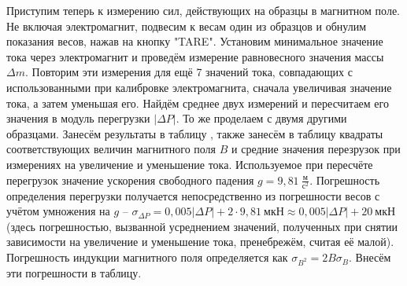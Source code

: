 \documentclass[a4paper,12pt]{article}
\begin{document}
Приступим теперь к измерению сил, действующих на образцы в магнитном поле. Не включая электромагнит, подвесим к весам один из образцов и обнулим показания весов, нажав на кнопку "TARE". Установим минимальное значение тока через электромагнит и проведём измерение равновесного значения массы $\Delta m$. Повторим эти измерения для ещё 7 значений тока, совпадающих с использованными при калибровке электромагнита, сначала увеличивая значение тока, а затем уменьшая его. Найдём среднее двух измерений и пересчитаем его значения в модуль перегрузки $\left|\Delta P\right|$. То же проделаем с двумя другими образцами. Занесём результаты в таблицу , также занесём в таблицу квадраты соответствующих величин магнитного поля $B$ и средние значения перезрузок при измерениях на увеличение и уменьшение тока. Используемое при пересчёте перегрузок значение ускорения свободного падения $g=9,81~\frac{\text{м}}{\text{с}^2}$. Погрешность определения перегрузки получается непосредственно из погрешности весов с учётом умножения на $g$ -- $\sigma_{\Delta P}=0,005\left|\Delta P\right|+2\cdot9,81~\text{мкН}\approx0,005\left|\Delta P\right|+20~\text{мкН}$ (здесь погрешностью, вызванной усреднением значений, полученных при снятии зависимости на увеличение и уменьшение тока, пренебрежём, считая её малой). Погрешность индукции магнитного поля определяется как $\sigma_{B^2}=2B\sigma_B$. Внесём эти погрешности в таблицу.
\end{document}
